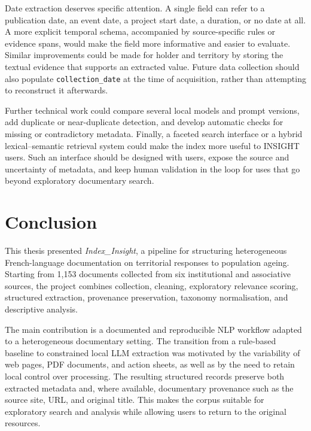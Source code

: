 \documentclass[
11pt,
english,
singlespacing,
headsepline,
]{MastersDoctoralThesis}
\begin{document}
Date extraction deserves specific attention. A single field can refer to a
publication date, an event date, a project start date, a duration, or no date
at all. A more explicit temporal schema, accompanied by source-specific rules
or evidence spans, would make the field more informative and easier to
evaluate. Similar improvements could be made for holder and territory by
storing the textual evidence that supports an extracted value. Future data
collection should also populate \texttt{collection\_date} at the time of
acquisition, rather than attempting to reconstruct it afterwards.

Further technical work could compare several local models and prompt versions,
add duplicate or near-duplicate detection, and develop automatic checks for
missing or contradictory metadata. Finally, a faceted search interface or a
hybrid lexical--semantic retrieval system could make the index more useful to
INSIGHT users. Such an interface should be designed with users, expose the
source and uncertainty of metadata, and keep human validation in the loop for
uses that go beyond exploratory documentary search.

\chapter{Conclusion}

This thesis presented \textit{Index\_Insight}, a pipeline for structuring heterogeneous French-language documentation on territorial responses to population ageing. Starting from 1,153 documents collected from six institutional and associative sources, the project combines collection, cleaning, exploratory relevance scoring, structured extraction, provenance preservation, taxonomy normalisation, and descriptive analysis.

The main contribution is a documented and reproducible NLP workflow adapted to a heterogeneous documentary setting. The transition from a rule-based baseline to constrained local LLM extraction was motivated by the variability of web pages, PDF documents, and action sheets, as well as by the need to retain local control over processing. The resulting structured records preserve both extracted metadata and, where available, documentary provenance such as the source site, URL, and original title. This makes the corpus suitable for exploratory search and analysis while allowing users to return to the original resources.
\end{document}
